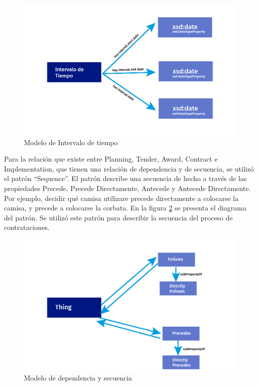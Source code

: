 \begin{figure}[ht!]
    \centering
    \includegraphics[width=150mm]{figuras/Diagramas_Tiempo.png}
    \caption{Modelo de Intervalo de tiempo}
    \label{img:Modelo de Intervalo de precio}
    
\end{figure}

Para la relación que existe entre Planning, Tender, Award, Contract e Implementation, que tienen una relación de dependencia y de secuencia, se utilizó el patrón “Sequence”. El patrón describe una secuencia de hecho a través de las propiedades Precede, Precede Directamente, Antecede y Antecede Directamente. Por ejemplo, decidir qué camisa utilizare precede directamente a colocarse la camisa, y precede a colocarse la corbata. En la figura \ref{img:Modelo de dependencia y secuencia} se presenta el diagrama del patrón. Se utilizó este patrón para describir la secuencia del proceso de contrataciones.

\begin{figure}[ht!]
    \centering
    \includegraphics[width=150mm]{figuras/Diagramas_Follows.png}
    \caption{Modelo de dependencia y secuencia}
    \label{img:Modelo de dependencia y secuencia}
    
\end{figure}

